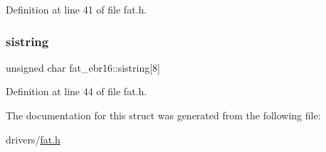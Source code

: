 Definition at line 41 of file fat.\+h.

\mbox{\label{structfat__ebr16_a1008703850aab97e1aa8ae5ea8511ab1_a1008703850aab97e1aa8ae5ea8511ab1}} 
\subsubsection{\texorpdfstring{sistring}{sistring}}
{\footnotesize\ttfamily unsigned char fat\+\_\+ebr16\+::sistring\mbox{[}8\mbox{]}}



Definition at line 44 of file fat.\+h.



The documentation for this struct was generated from the following file\+:\begin{DoxyCompactItemize}
\item 
drivers/\hyperlink{fat_8h}{fat.\+h}\end{DoxyCompactItemize}
